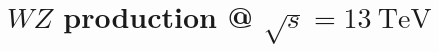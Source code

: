 \chapter[$WZ$ production @ $\sqrt{s} = 13~\mathrm{TeV}$][$WZ$ production @ $\sqrt{s} = 13~\mathrm{TeV}$]{$WZ$ production @ $\sqrt{s} = 13~\mathrm{TeV}$}
\label{ch:wz13tev}

